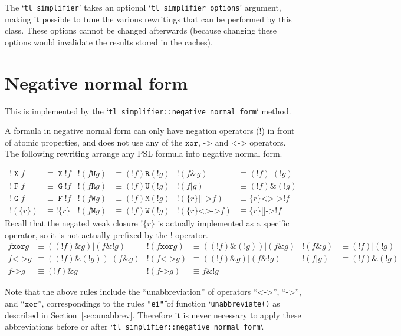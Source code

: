 \documentclass[a4paper,twoside,10pt,DIV=12]{scrreprt}
\DeclareMathOperator{\F}{\texttt{F}}
\DeclareMathOperator{\G}{\texttt{G}}
\newcommand{\U}{\mathbin{\texttt{U}}}
\newcommand{\R}{\mathbin{\texttt{R}}}
\DeclareMathOperator{\X}{\texttt{X}}
\newcommand{\M}{\mathbin{\texttt{M}}}
\newcommand{\W}{\mathbin{\texttt{W}}}
\DeclareMathOperator{\NOT}{\texttt{!}}
\newcommand{\XOR}{\mathbin{\texttt{xor}}}
\newcommand{\IMPLIES}{\mathbin{\texttt{->}}}
\newcommand{\EQUIV}{\mathbin{\texttt{<->}}}
\newcommand{\OR}{\mathbin{\texttt{|}}}
\newcommand{\AND}{\mathbin{\texttt{\&}}}
\newcommand{\0}{\texttt{0}}
\newcommand{\1}{\texttt{1}}
\newcommand{\Esuffix}{\texttt{<>->}}
\newcommand{\Asuffix}{\texttt{[]->}}
\newcommand{\sere}[1]{\texttt{\{}#1\texttt{\}}}
\newcommand{\nsere}[1]{\texttt{!\{}#1\texttt{\}}}
\begin{document}
The `\verb|tl_simplifier|' takes an optional
`\verb|tl_simplifier_options|' argument, making it possible to tune
the various rewritings that can be performed by this class.  These
options cannot be changed afterwards (because changing these options
would invalidate the results stored in the caches).

\section{Negative normal form}\label{sec:nnf}

This is implemented by the `\verb|tl_simplifier::negative_normal_form|`
method.

A formula in negative normal form can only have negation
operators ($\NOT$) in front of atomic properties, and does not use any
of the $\XOR$, $\IMPLIES$ and $\EQUIV$ operators.  The following
rewriting arrange any PSL formula into negative normal form.

\begin{align*}
  \NOT\X f & \equiv \X\NOT f &
  \NOT(f \U g) & \equiv (\NOT f) \R (\NOT g) &
  \NOT(f \AND g)&\equiv (\NOT f) \OR (\NOT g)
  \\
  \NOT\F f & \equiv \G\NOT f &
  \NOT(f \R g) & \equiv (\NOT f) \U (\NOT g) &
  \NOT(f \OR g)&\equiv (\NOT f)\AND (\NOT g)
  \\
  \NOT\G f & \equiv \F\NOT f &
  \NOT(f \W g) & \equiv (\NOT f) \M (\NOT g) &
  \NOT(\sere{r} \Asuffix f) &\equiv \sere{r} \Esuffix \NOT f
  \\
  \NOT(\sere{r})&\equiv \nsere{r}&
  \NOT(f \M g) & \equiv (\NOT f) \W (\NOT g)&
  \NOT(\sere{r} \Esuffix f) &\equiv \sere{r} \Asuffix \NOT f
\end{align*}
\noindent Recall that the negated weak closure $\nsere{r}$ is actually
implemented as a specific operator, so it is not actually prefixed by the
$\NOT$ operator.
\begin{align*}
  f \XOR g & \equiv ((\NOT f)\AND g)\OR(f\AND\NOT g) &
  \NOT(f \XOR g) & \equiv ((\NOT f)\AND(\NOT g))\OR(f\AND g) &
  \NOT(f \AND g) & \equiv (\NOT f)\OR(\NOT g) \\
  f \EQUIV g & \equiv ((\NOT f)\AND(\NOT g))\OR(f\AND g) &
  \NOT(f \EQUIV g) & \equiv ((\NOT f)\AND g)\OR(f\AND\NOT g) &
  \NOT(f \OR g) & \equiv (\NOT f)\AND(\NOT g) \\
  f \IMPLIES g & \equiv (\NOT f) \AND g &
  \NOT(f \IMPLIES g) & \equiv f \AND \NOT g
\end{align*}

Note that the above rules include the ``unabbreviation'' of operators
``$\EQUIV$'', ``$\IMPLIES$'', and ``$\XOR$'', correspondings to the
rules \texttt{"ei\^"} of function `\verb=unabbreviate()= as described
in Section~\ref{sec:unabbrev}.  Therefore it is never necessary to
apply these abbreviations before or after
`\verb|tl_simplifier::negative_normal_form|`.
\end{document}
